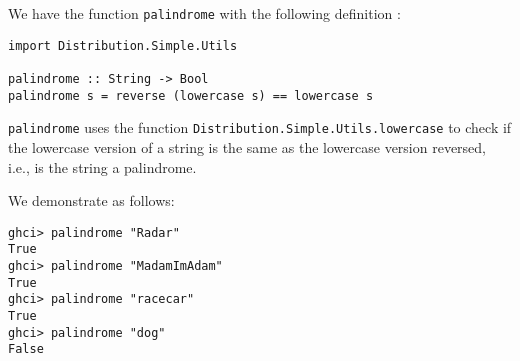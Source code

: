 
We have the function \verb|palindrome| with the following 
definition : 
\scriptsize\begin{verbatim}
import Distribution.Simple.Utils

palindrome :: String -> Bool
palindrome s = reverse (lowercase s) == lowercase s 
\end{verbatim}\normalsize
\verb|palindrome| uses the function 
\verb|Distribution.Simple.Utils.lowercase| to check if the lowercase version 
of a string is the same as the lowercase version reversed, i.e., is the 
string a palindrome.\par
\qquad We demonstrate as follows:
\scriptsize\begin{verbatim}
ghci> palindrome "Radar"
True
ghci> palindrome "MadamImAdam"
True
ghci> palindrome "racecar"
True
ghci> palindrome "dog"
False
\end{verbatim}\normalsize
